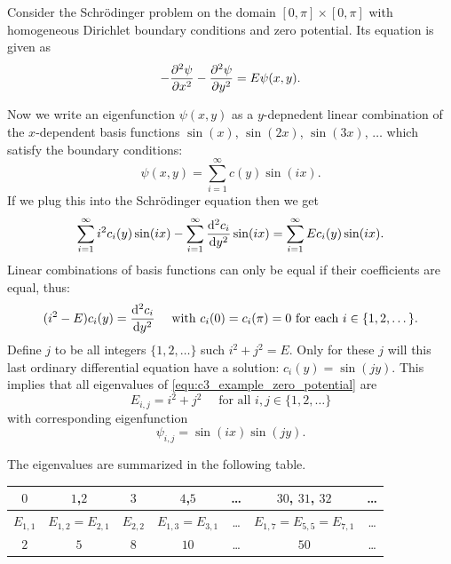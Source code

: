 \begin{example}\label{exa:c3_zero_potential}
    Consider the Schrödinger problem on the domain $[0, \pi] \times [0, \pi]$ with homogeneous Dirichlet boundary conditions and zero potential. Its equation is given as
    \begin{equation}\label{equ:c3_example_zero_potential}
        -\pdv[2]{\psi}{x} - \pdv[2]{\psi}{y} = E \psi(x, y)\text{.}
    \end{equation}

    Now we write an eigenfunction $\psi(x, y)$ as a $y$-depnedent linear combination of the $x$-dependent basis functions $\sin(x)$, $\sin(2x)$, $\sin(3x)$, $\dots$ which satisfy the boundary conditions:
    $$
        \psi(x, y) = \sum_{i=1}^\infty c(y) \sin(ix)\text{.}
    $$
    If we plug this into the Schrödinger equation then we get
    $$
        \sum_{i=1}^\infty i^2 c_i(y) \sin(ix) - \sum_{i=1}^\infty \dv[2]{c_i}{y}(y) \sin(ix) = \sum_{i=1}^\infty E c_i(y) \sin(ix)\text{.}
    $$
    Linear combinations of basis functions can only be equal if their coefficients are equal, thus:
    $$
        (i^2 - E) c_i(y) = \dv[2]{c_i}{y}(y) \quad \text{ with $c_i(0) = c_i(\pi) = 0$ for each $i \in \{1, 2, \dots\}$.}
    $$
    Define $j$ to be all integers $\{1, 2, \dots\}$ such $i^2 + j^2 = E$. Only for these $j$ will this last ordinary differential equation have a solution: $c_i(y) = \sin(j y)$. This implies that all eigenvalues of \eqref{equ:c3_example_zero_potential} are
    $$
        E_{i, j} = i^2 + j^2 \quad \text{ for all $i, j \in \{1, 2, \dots\}$}
    $$
    with corresponding eigenfunction
    $$
        \psi_{i,j} = \sin(ix) \sin(jy)\text{.}
    $$

    The eigenvalues are summarized in the following table.

    \begin{tabular}{ccccccc}
        \toprule
        $0$             & $1$,$2$                         & $3$             & $4$,$5$                         & \dots & $30$, $31$, $32$                                & \dots \\
        \midrule
        $E_{1,1}$ & $E_{1,2} = E_{2,1}$ & $E_{2,2}$ & $E_{1,3} = E_{3,1}$ & \dots & $E_{1,7} = E_{5,5} = E_{7,1}$ & \dots \\
        $2$             & $5$                             & $8$             & $10$                            & \dots & $50$                                            & \dots \\
        \bottomrule
    \end{tabular}


\end{example}
